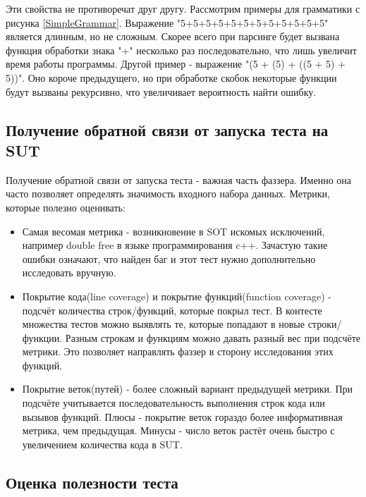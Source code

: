 \documentclass[a4paper]{article}
\begin{document}
Эти свойства не противоречат друг другу. Рассмотрим примеры для грамматики с рисунка \ref{SimpleGrammar}. Выражение "5+5+5+5+5+5+5+5+5+5+5+5" является длинным, но не сложным. Скорее всего при парсинге будет вызвана функция обработки знака "+" несколько раз последовательно, что лишь увеличит время работы программы. Другой пример - выражение "(5 + (5) + ((5 + 5) + 5))". Оно короче предыдущего, но при обработке скобок некоторые функции будут вызваны рекурсивно, что увеличивает вероятность найти ошибку.

\subsection{Получение обратной связи от запуска теста на SUT}
\indent

Получение обратной связи от запуска теста - важная часть фаззера. Именно она часто позволяет определять значимость входного набора данных. Метрики, которые полезно оценивать:

\begin{itemize}
\item Самая весомая метрика - возникновение в SOT искомых исключений,
например double free в языке программирования c++. Зачастую такие ошибки означают, что найден баг и этот тест нужно дополнительно исследовать вручную.
\item Покрытие кода(line coverage) и покрытие функций(function coverage) - подсчёт количества строк/функций, которые покрыл тест. В контесте множества тестов можно выявлять те, которые попадают в новые строки/функции. Разным строкам и функциям можно давать разный вес при подсчёте метрики. Это позволяет направлять фаззер в сторону исследования этих функций.
\item Покрытие веток(путей) - более сложный вариант предыдущей метрики. При подсчёте учитывается последовательность выполнения строк кода или вызывов функций. Плюсы - покрытие веток гораздо более информативная метрика, чем предыдущая. Минусы - число веток растёт очень быстро с увеличением количества кода в SUT.
\end{itemize}

\subsection{Оценка полезности теста}
\indent
\end{document}
